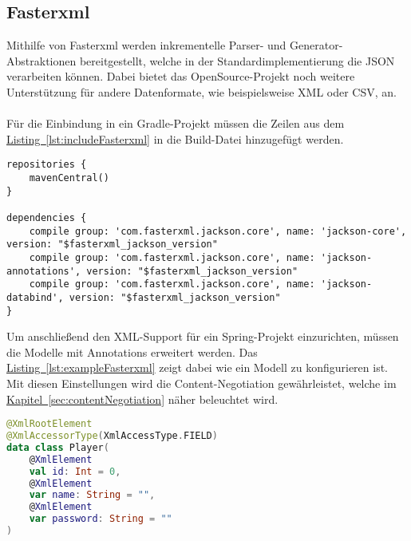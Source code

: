\subsection{Fasterxml}\label{sec:bibfasterxml}
Mithilfe von Fasterxml werden inkrementelle Parser- und Generator-Abstraktionen bereitgestellt, welche in der Standardimplementierung die \gls{JSON} verarbeiten können. Dabei bietet das OpenSource-Projekt noch weitere Unterstützung für andere Datenformate, wie beispielsweise \gls{XML} oder \gls{CSV}, an.\cite{fasterxml}\\
\\
Für die Einbindung in ein Gradle-Projekt müssen die Zeilen aus dem \hyperref[lst:includeFasterxml]{Listing~\ref{lst:includeFasterxml}} in die Build-Datei hinzugefügt werden.
\begin{lstlisting}[style=lstStyleFramed, language=Gradle, caption={Einbindung der Bibliothek Fasterxml mithilfe von Gradle}, label=lst:includeFasterxml, float]
repositories {
	mavenCentral()
}

dependencies {
	compile group: 'com.fasterxml.jackson.core', name: 'jackson-core', version: "$fasterxml_jackson_version"
	compile group: 'com.fasterxml.jackson.core', name: 'jackson-annotations', version: "$fasterxml_jackson_version"
	compile group: 'com.fasterxml.jackson.core', name: 'jackson-databind', version: "$fasterxml_jackson_version"
}
\end{lstlisting}
Um anschließend den \gls{XML}-Support für ein Spring-Projekt einzurichten, müssen die Modelle mit Annotations erweitert werden. Das \hyperref[lst:exampleFasterxml]{Listing~\ref{lst:exampleFasterxml}} zeigt dabei wie ein Modell zu konfigurieren ist. Mit diesen Einstellungen wird die Content-Negotiation gewährleistet, welche im \hyperref[sec:contentNegotiation]{Kapitel~\ref{sec:contentNegotiation}} näher beleuchtet wird.
\begin{lstlisting}[style=lstStyleFramed, language=Kotlin, caption={Beispiel: Verwendung von Fasterxml}, label=lst:exampleFasterxml, float]
@XmlRootElement
@XmlAccessorType(XmlAccessType.FIELD)
data class Player(
	@XmlElement
	val id: Int = 0,
	@XmlElement
	var name: String = "",
	@XmlElement
	var password: String = ""
)
\end{lstlisting} 


